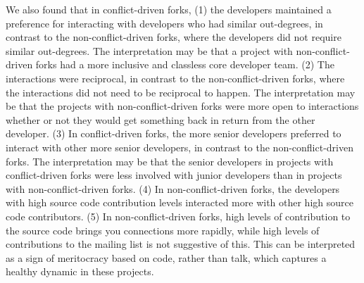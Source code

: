 \documentclass[12pt,letterpaper]{gthesis2}  %
\begin{document}
We also found that in conflict-driven forks, (1) the developers maintained a preference for interacting with developers who had similar out-degrees, in contrast to the non-conflict-driven forks, where the developers did not require similar out-degrees. The interpretation may be that a project with non-conflict-driven forks had a more inclusive and classless core developer team. (2) The interactions were reciprocal, in contrast to the non-conflict-driven forks, where the interactions did not need to be reciprocal to happen. The interpretation may be that the projects with non-conflict-driven forks were more open to interactions whether or not they would get something back in return from the other developer. (3) In conflict-driven forks, the more senior developers preferred to interact with other more senior developers, in contrast to the non-conflict-driven forks. The interpretation may be that the senior developers in projects with conflict-driven forks were less involved with junior developers than in projects with non-conflict-driven forks. (4) In non-conflict-driven forks, the developers with high source code contribution levels interacted more with other high source code contributors. (5) In non-conflict-driven forks, high levels of contribution to the source code brings you connections more rapidly, while high levels of contributions to the mailing list is not suggestive of this. This can be interpreted as a sign of meritocracy based on code, rather than talk, which captures a healthy dynamic in these projects.
\end{document}
